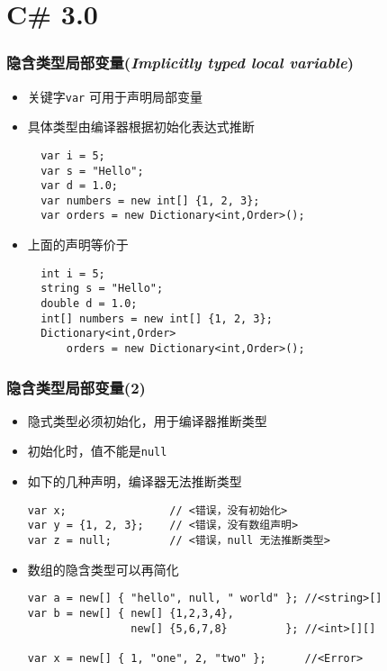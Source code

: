 
\section{C\# 3.0}

\begin{frame}[fragile]
\frametitle{隐含类型局部变量(\textit{Implicitly typed local variable})}

\begin{itemize}
\item 关键字\texttt{var} 可用于声明局部变量
\item 具体类型由编译器根据初始化表达式推断
\begin{lstlisting}
  var i = 5;
  var s = "Hello";
  var d = 1.0;
  var numbers = new int[] {1, 2, 3};
  var orders = new Dictionary<int,Order>();
\end{lstlisting}
\pause
\item 上面的声明等价于
\begin{lstlisting}
  int i = 5;
  string s = "Hello";
  double d = 1.0;
  int[] numbers = new int[] {1, 2, 3};
  Dictionary<int,Order>
      orders = new Dictionary<int,Order>();
\end{lstlisting}
\end{itemize}
\end{frame}

\begin{frame}[fragile]
\frametitle{隐含类型局部变量(2)}
\begin{itemize}
\item 隐式类型必须初始化，用于编译器推断类型
\item 初始化时，值不能是\texttt{null}
\item 如下的几种声明，编译器无法推断类型
\begin{lstlisting}[escapeinside=<>]
var x;                // <错误，没有初始化>
var y = {1, 2, 3};    // <错误，没有数组声明>
var z = null;         // <错误，null 无法推断类型>
\end{lstlisting}
\pause
\item 数组的隐含类型可以再简化
\begin{lstlisting}
var a = new[] { "hello", null, " world" }; //<string>[]
var b = new[] { new[] {1,2,3,4},
                new[] {5,6,7,8}         }; //<int>[][]

var x = new[] { 1, "one", 2, "two" };      //<Error>
\end{lstlisting}
\end{itemize}
\end{frame}

